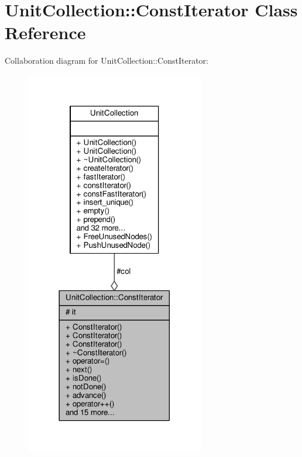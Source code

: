 \hypertarget{classUnitCollection_1_1ConstIterator}{}\section{Unit\+Collection\+:\+:Const\+Iterator Class Reference}
\label{classUnitCollection_1_1ConstIterator}


Collaboration diagram for Unit\+Collection\+:\+:Const\+Iterator\+:
\nopagebreak
\begin{figure}[H]
\begin{center}
\leavevmode
\includegraphics[width=221pt]{d3/d4a/classUnitCollection_1_1ConstIterator__coll__graph}
\end{center}
\end{figure}
